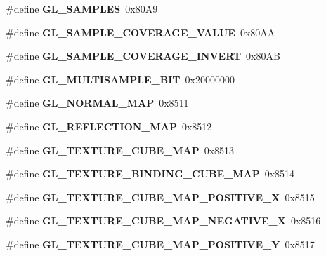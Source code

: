 \begin{DoxyCompactItemize}
\item 
\#define {\bfseries G\+L\+\_\+\+S\+A\+M\+P\+L\+E\+S}~0x80\+A9\label{_s_d_l__opengl_8h_a1527624bc8306b779ce730bcc4f757a4}

\item 
\#define {\bfseries G\+L\+\_\+\+S\+A\+M\+P\+L\+E\+\_\+\+C\+O\+V\+E\+R\+A\+G\+E\+\_\+\+V\+A\+L\+U\+E}~0x80\+A\+A\label{_s_d_l__opengl_8h_a0ec2d62f355f2dc750d1977345938b33}

\item 
\#define {\bfseries G\+L\+\_\+\+S\+A\+M\+P\+L\+E\+\_\+\+C\+O\+V\+E\+R\+A\+G\+E\+\_\+\+I\+N\+V\+E\+R\+T}~0x80\+A\+B\label{_s_d_l__opengl_8h_a493a344af6533267a8be2b58a23130fa}

\item 
\#define {\bfseries G\+L\+\_\+\+M\+U\+L\+T\+I\+S\+A\+M\+P\+L\+E\+\_\+\+B\+I\+T}~0x20000000\label{_s_d_l__opengl_8h_a0b551148113ae3e7f81e5e9276be21ff}

\item 
\#define {\bfseries G\+L\+\_\+\+N\+O\+R\+M\+A\+L\+\_\+\+M\+A\+P}~0x8511\label{_s_d_l__opengl_8h_ac85ab960342ae6bd06881aabf31899d5}

\item 
\#define {\bfseries G\+L\+\_\+\+R\+E\+F\+L\+E\+C\+T\+I\+O\+N\+\_\+\+M\+A\+P}~0x8512\label{_s_d_l__opengl_8h_a26f8fe65ab3dc613b54b38220c54ac5e}

\item 
\#define {\bfseries G\+L\+\_\+\+T\+E\+X\+T\+U\+R\+E\+\_\+\+C\+U\+B\+E\+\_\+\+M\+A\+P}~0x8513\label{_s_d_l__opengl_8h_a26e189fe84285eb8fae26721662dbe8c}

\item 
\#define {\bfseries G\+L\+\_\+\+T\+E\+X\+T\+U\+R\+E\+\_\+\+B\+I\+N\+D\+I\+N\+G\+\_\+\+C\+U\+B\+E\+\_\+\+M\+A\+P}~0x8514\label{_s_d_l__opengl_8h_ab7d35cf593b0af570c79a6a9a8d2c479}

\item 
\#define {\bfseries G\+L\+\_\+\+T\+E\+X\+T\+U\+R\+E\+\_\+\+C\+U\+B\+E\+\_\+\+M\+A\+P\+\_\+\+P\+O\+S\+I\+T\+I\+V\+E\+\_\+\+X}~0x8515\label{_s_d_l__opengl_8h_ab83eb56dce8e1f7900585d35016abf39}

\item 
\#define {\bfseries G\+L\+\_\+\+T\+E\+X\+T\+U\+R\+E\+\_\+\+C\+U\+B\+E\+\_\+\+M\+A\+P\+\_\+\+N\+E\+G\+A\+T\+I\+V\+E\+\_\+\+X}~0x8516\label{_s_d_l__opengl_8h_ae642ad8e3baa2512e2e27be2cf17373d}

\item 
\#define {\bfseries G\+L\+\_\+\+T\+E\+X\+T\+U\+R\+E\+\_\+\+C\+U\+B\+E\+\_\+\+M\+A\+P\+\_\+\+P\+O\+S\+I\+T\+I\+V\+E\+\_\+\+Y}~0x8517\label{_s_d_l__opengl_8h_a0605d5ef41613665b34391f9ba398997}


\end{DoxyCompactItemize}
